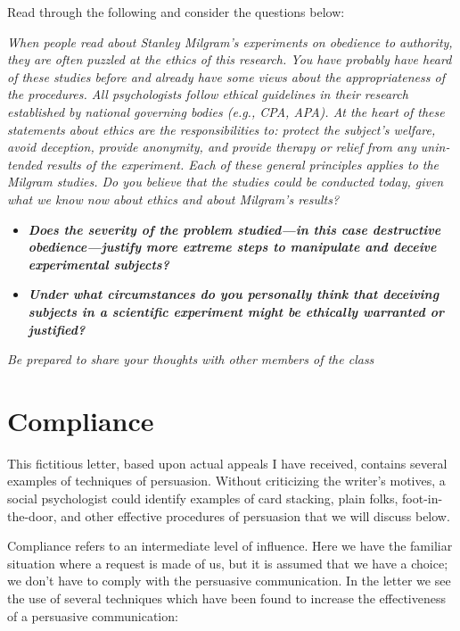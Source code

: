 \documentclass[
]{book}
\providecommand{\tightlist}{%
  \setlength{\itemsep}{0pt}\setlength{\parskip}{0pt}}
\begin{document}
\begin{reflect}
Read through the following and consider the questions below:

\emph{When people read about Stanley Milgram's experiments on obedience to au­thor­ity, they are often puzzled at the ethics of this research. You have probably have heard of these studies before and already have some views about the ap­propriate­ness of the procedures. All psychologists follow ethical guidelines in their research established by national governing bodies (e.g., CPA, APA). At the heart of these state­ments about ethics are the responsibilities to: protect the subject's welfare, avoid deception, provide anonymity, and provide therapy or relief from any unin­tended results of the experiment. Each of these general principles applies to the Milgram studies. Do you believe that the studies could be conducted today, given what we know now about ethics and about Milgram's results?}

\begin{itemize}
\tightlist
\item
  \textbf{\emph{Does the severity of the problem studied---in this case destructive obedience---justify more extreme steps to manipulate and deceive experimental subjects?}}\\
\item
  \textbf{\emph{Under what circumstances do you personally think that deceiving subjects in a scientific experiment might be ethically warranted or justified?}}
\end{itemize}

\emph{Be prepared to share your thoughts with other members of the class}
\end{reflect}

\hypertarget{compliance}{%
\section{Compliance}\label{compliance}}

This fictitious letter, based upon actual appeals I have received, contains several examples of techniques of persuasion. Without criticizing the writer's motives, a social psychologist could identify examples of card stacking, plain folks, foot-in-the-door, and other effective procedures of persuasion that we will discuss below.

Compliance refers to an intermediate level of influence. Here we have the familiar situation where a request is made of us, but it is assumed that we have a choice; we don't have to comply with the persuasive communication. In the letter we see the use of several techniques which have been found to increase the effectiveness of a persuasive communication:
\end{document}
